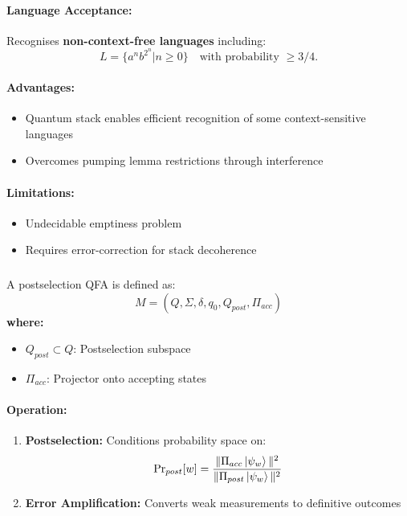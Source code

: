 \paragraph{Language Acceptance:}
Recognises \textbf{non-context-free languages} including:
\[
L = \{a^nb^{2^n} | n \geq 0\} \quad \text{with probability } \geq 3/4. 
\]
\cite{bertoni2001quantum}

\paragraph{Advantages:}
\begin{itemize}
    \item Quantum stack enables efficient recognition of some context-sensitive languages \cite{ambainis2002quantum}
    \item Overcomes pumping lemma restrictions through interference
\end{itemize}

\paragraph{Limitations:}
\begin{itemize}
    \item Undecidable emptiness problem
    \item Requires error-correction for stack decoherence
\end{itemize}

\subsubsection{}
\label{subsec:psqfa}

\begin{definition}
A postselection QFA \cite{aaronson2005complexity} is defined as:
\[
M = (Q, \Sigma, \delta, q_0, Q_{post}, \Pi_{acc})
\]
\textbf{where:}
\begin{itemize}
    \item $Q_{post} \subset Q$: Postselection subspace
    \item $\Pi_{acc}$: Projector onto accepting states
\end{itemize}
\end{definition}

\paragraph{Operation:}
\begin{enumerate}
    \item \textbf{Postselection:} Conditions probability space on:
    \[
    \text{Pr}_{post}[w] = \frac{\|\Pi_{acc}\ket{\psi_w}\|^2}{\|\Pi_{post}\ket{\psi_w}\|^2}
    \]
    \item \textbf{Error Amplification:} Converts weak measurements to definitive outcomes \cite{yamakami2014constant}
\end{enumerate}

